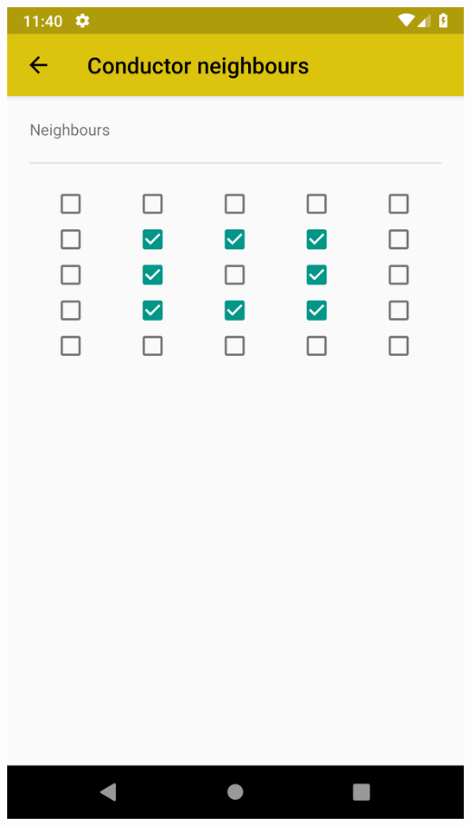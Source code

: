 \documentclass{report}
\begin{document}
\begin{minipage}{.45\textwidth}
\begin{minipage}{.45\linewidth}
    \includegraphics[width=\linewidth]{screens/cell_neighbours.png}
  \end{minipage}\hfill
\end{minipage}
\vspace{20pt}
\end{document}
